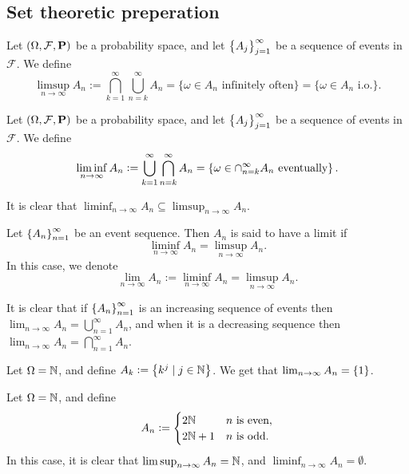 \documentclass[11pt,a4paper]{article}
\begin{document}
\subsection{Set theoretic preperation}
\begin{definition}
  Let $(\Omega, \mathcal F, \mathbf{P})$ be a probability space, and 
  let $\left\{A_j\right\}_{j = 1}^{\infty}$ be a sequence of events in $\mathcal F$.
  We define
  \[
    \limsup_{n \to \infty} A_n :=
    \bigcap_{k=1}^{\infty} \bigcup_{n=k}^{\infty} A_n =
    \{\omega \in A_n \text{ infinitely often}\} =
    \{\omega \in A_n\text{ i.o.}\}.
  \]
\end{definition}
\begin{definition}
  Let $(\Omega, \mathcal F, \mathbf{P})$ be a probability space, and 
  let $\left\{A_j\right\}_{j = 1}^{\infty}$ be a sequence of events in $\mathcal F$.
  We define
  \[
    \liminf_{n \to \infty} A_n :=
    \bigcup_{k=1}^{\infty} \bigcap_{n=k}^{\infty} A_n =
    \left\{\omega \in \cap_{n=k}^{\infty} A_n \text{ eventually}\right\}.
  \]
\end{definition}
\begin{remark}
  It is clear that
  $\liminf_{n \to \infty} A_n \subseteq \limsup_{n \to \infty} A_n$.
\end{remark}
\begin{definition}
  Let $\left\{A_n\right\}_{n=1}^{\infty}$ be an event sequence.
  Then $A_n$ is said to have a limit if
  \[
    \liminf_{n \to \infty} A_n = \limsup_{n \to \infty} A_n.
  \]
  In this case, we denote
  \[
    \lim_{n \to \infty} A_n :=
    \liminf_{n \to \infty} A_n = \limsup_{n \to \infty} A_n.
  \]
\end{definition}

\begin{example}
  It is clear that if $\left\{A_n\right\}_{n=1}^{\infty}$ is an increasing
  sequence of events then
  $\lim_{n \to \infty} A_n = \bigcup_{n=1}^{\infty} A_n$,
  and when it is a decreasing sequence then
  $\lim_{n \to \infty} A_n = \bigcap_{n=1}^{\infty} A_n$.
\end{example}

\begin{example}
  Let $\Omega = \mathbb{N}$,
  and define $A_k := \left\{k^j \mid j \in \mathbb{N}\right\}$.
  We get that $\lim_{n \to \infty} A_n = \left\{1\right\}$.
\end{example}

\begin{example}
  Let $\Omega = \mathbb{N}$, and define
  \[
    A_n :=
    \begin{cases}
      2\mathbb{N} &n\text{ is even}, \\
      2\mathbb{N} + 1 &n\text{ is odd}.
    \end{cases}
  \]
  In this case,
  it is clear that $\limsup_{n \to \infty} A_n = \mathbb{N}$,
  and $\liminf_{n \to \infty} A_n = \emptyset$.
\end{example}
\end{document}
